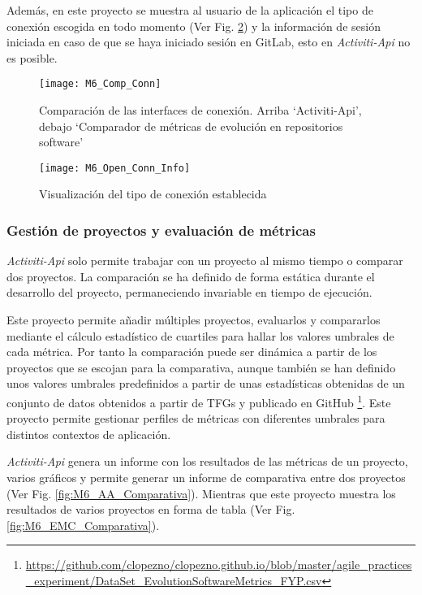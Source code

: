 Además, en este proyecto se muestra al usuario de la aplicación el tipo de conexión escogida en todo momento (Ver Fig. \ref{fig:M6_Open_Conn_Info}) y la información de sesión iniciada en caso de que se haya iniciado sesión en GitLab, esto en \textit{Activiti-Api} no es posible.

\begin{figure}[!h]
	\centering
	\texttt{[image: M6\_Comp\_Conn]}
	\caption{Comparación de las interfaces de conexión. Arriba `Activiti-Api', debajo `Comparador de métricas de evolución en repositorios software'}\label{fig:M6_Comp_Conn}
\end{figure}
\FloatBarrier

\begin{figure}[!h]
	\centering
	\texttt{[image: M6\_Open\_Conn\_Info]}
	\caption{Visualización del tipo de conexión establecida}\label{fig:M6_Open_Conn_Info}
\end{figure}
\FloatBarrier

\subsubsection{Gestión de proyectos y evaluación de métricas}

\textit{Activiti-Api} solo permite trabajar con un proyecto al mismo tiempo o comparar dos proyectos. La comparación se ha definido de forma estática durante el desarrollo del proyecto, permaneciendo invariable en tiempo de ejecución.

Este proyecto permite añadir múltiples proyectos, evaluarlos y compararlos mediante el cálculo estadístico de cuartiles para hallar los valores umbrales de cada métrica. Por tanto la comparación puede ser dinámica a partir de los proyectos que se escojan para la comparativa, aunque también se han definido unos valores umbrales predefinidos a partir de unas estadísticas obtenidas de un conjunto de datos obtenidos a partir de TFGs y publicado en GitHub \footnote{\url{https://github.com/clopezno/clopezno.github.io/blob/master/agile_practices_experiment/DataSet_EvolutionSoftwareMetrics_FYP.csv}}. Este proyecto permite gestionar perfiles de métricas con diferentes umbrales para distintos contextos de aplicación.

\textit{Activiti-Api} genera un informe con los resultados de las métricas de un proyecto, varios gráficos y permite generar un informe de comparativa entre dos proyectos (Ver Fig. \ref{fig:M6_AA_Comparativa}). Mientras que este proyecto muestra los resultados de varios proyectos en forma de tabla (Ver Fig. \ref{fig:M6_EMC_Comparativa}).


